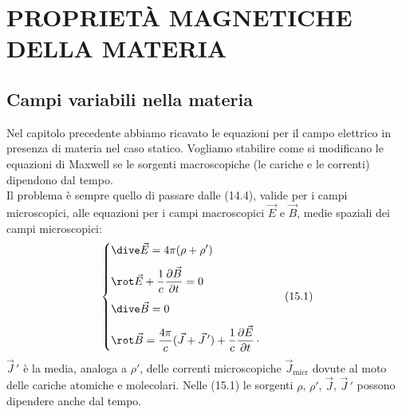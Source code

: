 \section{PROPRIET\`A MAGNETICHE DELLA MATERIA}

\subsection{Campi variabili nella materia}

Nel capitolo precedente abbiamo ricavato le equazioni per il campo elettrico in
presenza di materia nel caso statico. Vogliamo stabilire come si modificano le
equazioni di Maxwell se le sorgenti macroscopiche (le cariche e le correnti)
dipendono dal tempo.\\
Il problema \`e sempre quello di passare dalle (14.4), valide per i campi
microscopici, alle equazioni per i campi macroscopici $\vec E$ e $\vec B$, medie
spaziali dei campi microscopici:
\begin{equation}
  \left\{\begin{aligned}
    &\dive\vec E=4\pi(\rho+\rho')\\[4pt]
    &\rot\vec E+\frac{1}{c}\frac{\partial\vec B}{\partial t}=0\\[4pt]
    &\dive\vec B=0\\[4pt]
    &\rot\vec B=\frac{4\pi}{c}(\vec J+\vec J\,')
    +\frac{1}{c}\frac{\partial\vec E}{\partial t}\,\cdot
  \end{aligned}\right.
  \tag{15.1}
\end{equation}
$\vec J\,'$ \`e la media, analoga a $\rho'$, delle correnti microscopiche
$\vec J_\mathrm{micr}$ dovute al moto delle cariche atomiche e molecolari. Nelle
(15.1) le sorgenti $\rho$, $\rho'$, $\vec J$, $\vec J\,'$ possono dipendere
anche dal tempo.

